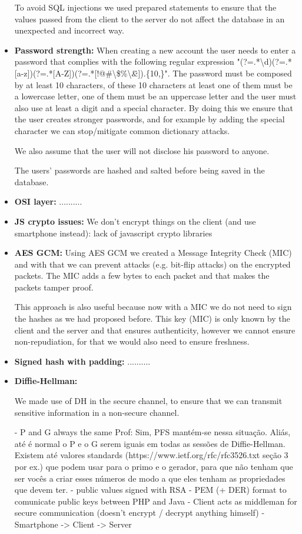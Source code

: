 \documentclass[12pt]{article}
\begin{document}
\begin{itemize}
  To avoid SQL injections we used prepared statements to ensure that the values passed from the client to the server do not affect the database in an unexpected and incorrect way.

  \item \textbf{Password strength:} 
  When creating a new account the user needs to enter a password that complies with the following regular expression "(?=.*\textbackslash d)(?=.*[a-z])(?=.*[A-Z])(?=.*[!@\#\textbackslash \$\%\textbackslash \^ \&]).\{10,\}". The password must be composed by at least 10 characters, of these 10 characters at least one of them must be a lowercase letter, one of them must be an uppercase letter and the user must also use at least a digit and a special character. By doing this we ensure that the user creates stronger passwords, and for example by adding the special character we can stop/mitigate common dictionary attacks.
 
  We also assume that the user will not disclose his password to anyone.
  
  The users' passwords are hashed and salted before being saved in the database.

  \item \textbf{OSI layer:} ..........
  \item \textbf{JS crypto issues:} We don't encrypt things on the client (and use smartphone instead): lack of javascript crypto libraries
  \item \textbf{AES GCM:} Using AES GCM we created a Message Integrity Check (MIC) and with that we can prevent attacks (e.g. bit-flip attacks) on the encrypted packets. The MIC adds a few bytes to each packet and that makes the packets tamper proof.
  
  This approach is also useful because now with a MIC we do not need to sign the hashes as we had proposed before. This key (MIC) is only known by the client and the server and that ensures authenticity, however we cannot ensure non-repudiation, for that we would also need to ensure freshness.

  \item \textbf{Signed hash with padding:} ..........
  \item \textbf{Diffie-Hellman:} 
  
  
  We made use of DH in the secure channel, to ensure that we can transmit sensitive information in a non-secure channel.
  
  - P and G always the same 
        Prof: Sim, PFS mantém-se nessa situação. Aliás, até é normal o P e o G serem iguais em todas as sessões de Diffie-Hellman. Existem até valores standards (https://www.ietf.org/rfc/rfc3526.txt seção 3 por ex.) que podem usar para o primo e o gerador, para que não tenham que ser vocês a criar esses números de modo a que eles tenham as propriedades que devem ter.
  - public values signed with RSA
  - PEM (+ DER) format to comunicate public keys between PHP and Java
  - Client acts as middleman for secure communication (doesn't encrypt / decrypt anything himself)
      - Smartphone -> Client -> Server
  

\end{itemize}
\end{document}
